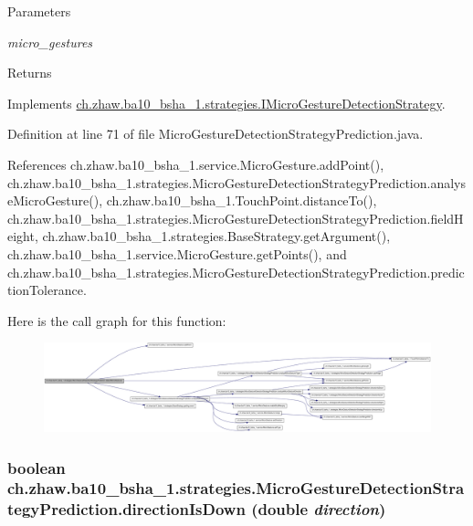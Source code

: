 \begin{DoxyParams}{Parameters}
\item[{\em micro\_\-gestures}]\end{DoxyParams}
\begin{DoxyReturn}{Returns}

\end{DoxyReturn}


Implements \hyperlink{interfacech_1_1zhaw_1_1ba10__bsha__1_1_1strategies_1_1IMicroGestureDetectionStrategy_a8593331fb67e5d4dc890d3db9f2d1b58}{ch.zhaw.ba10\_\-bsha\_\-1.strategies.IMicroGestureDetectionStrategy}.

Definition at line 71 of file MicroGestureDetectionStrategyPrediction.java.

References ch.zhaw.ba10\_\-bsha\_\-1.service.MicroGesture.addPoint(), ch.zhaw.ba10\_\-bsha\_\-1.strategies.MicroGestureDetectionStrategyPrediction.analyseMicroGesture(), ch.zhaw.ba10\_\-bsha\_\-1.TouchPoint.distanceTo(), ch.zhaw.ba10\_\-bsha\_\-1.strategies.MicroGestureDetectionStrategyPrediction.fieldHeight, ch.zhaw.ba10\_\-bsha\_\-1.strategies.BaseStrategy.getArgument(), ch.zhaw.ba10\_\-bsha\_\-1.service.MicroGesture.getPoints(), and ch.zhaw.ba10\_\-bsha\_\-1.strategies.MicroGestureDetectionStrategyPrediction.predictionTolerance.

Here is the call graph for this function:\nopagebreak
\begin{figure}[H]
\begin{center}
\leavevmode
\includegraphics[width=420pt]{classch_1_1zhaw_1_1ba10__bsha__1_1_1strategies_1_1MicroGestureDetectionStrategyPrediction_af8639be36ae7218b7f7d2feee8edc86f_cgraph}
\end{center}
\end{figure}
\hypertarget{classch_1_1zhaw_1_1ba10__bsha__1_1_1strategies_1_1MicroGestureDetectionStrategyPrediction_ac903a10ecc5d8bbf35d94b3675614dc9}{
\subsubsection[{directionIsDown}]{\setlength{\rightskip}{0pt plus 5cm}boolean ch.zhaw.ba10\_\-bsha\_\-1.strategies.MicroGestureDetectionStrategyPrediction.directionIsDown (double {\em direction})}}
\label{classch_1_1zhaw_1_1ba10__bsha__1_1_1strategies_1_1MicroGestureDetectionStrategyPrediction_ac903a10ecc5d8bbf35d94b3675614dc9}


